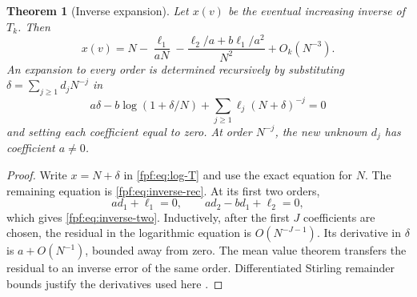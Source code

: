 \documentclass[11pt]{article}
\numberwithin{equation}{section}
\newtheorem{theorem}{Theorem}[section]
\theoremstyle{definition}
\begin{document}
\begin{theorem}[Inverse expansion]\label{fpf:thm:inverse}
Let $x(v)$ be the eventual increasing inverse of $T_k$. Then
\begin{equation}\label{fpf:eq:inverse-two}
 \boxed{\displaystyle
 x(v)=N-\frac{\ell_1}{aN}
       -\frac{\ell_2/a+b\ell_1/a^2}{N^2}+O_k(N^{-3}).}
\end{equation}
An expansion to every order is determined recursively by substituting
$\delta=\sum_{j\ge1}d_jN^{-j}$ in
\begin{equation}\label{fpf:eq:inverse-rec}
 a\delta-b\log(1+\delta/N)
       +\sum_{j\ge1}\ell_j(N+\delta)^{-j}=0
\end{equation}
and setting each coefficient equal to zero. At order $N^{-j}$, the new
unknown $d_j$ has coefficient $a\ne0$.
\end{theorem}
\begin{proof}
Write $x=N+\delta$ in \eqref{fpf:eq:log-T} and use the exact equation for $N$.
The remaining equation is \eqref{fpf:eq:inverse-rec}. At its first two orders,
\[
 ad_1+\ell_1=0,\qquad ad_2-bd_1+\ell_2=0,
\]
which gives \eqref{fpf:eq:inverse-two}. Inductively, after the first $J$
coefficients are chosen, the residual in the logarithmic equation is
$O(N^{-J-1})$. Its derivative in $\delta$ is $a+O(N^{-1})$, bounded away
from zero. The mean value theorem transfers the residual to an inverse
error of the same order. Differentiated Stirling remainder bounds justify
the derivatives used here \cite{dlmfgamma}.
\end{proof}
\end{document}
